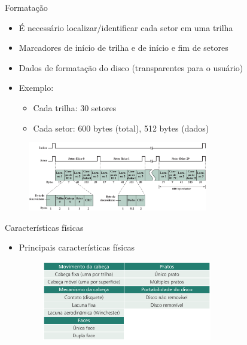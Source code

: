 \begin{slide}{Formatação}
	\begin{itemize}
		\item É necessário localizar/identificar cada setor em uma trilha
		\item Marcadores de início de trilha e de início e fim de setores
		\item Dados de formatação do disco (transparentes para o usuário)
		\item Exemplo:
			\begin{itemize}
				\item Cada trilha: 30 setores
				\item Cada setor: 600 bytes (total), 512 bytes (dados)
			\end{itemize}
	\end{itemize}
			\begin{figure}[h]
				\centering
				\includegraphics[width=0.7\textwidth]{figs/formato-winchester}
			\end{figure}
\end{slide}

\begin{slide}{Características físicas}
	\begin{itemize}
		\item Principais características físicas
			\begin{figure}[h]
				\centering
				\includegraphics[width=0.7\textwidth]{figs/caracteristicas-fisicas-disco}
			\end{figure}
	\end{itemize}
\end{slide}

